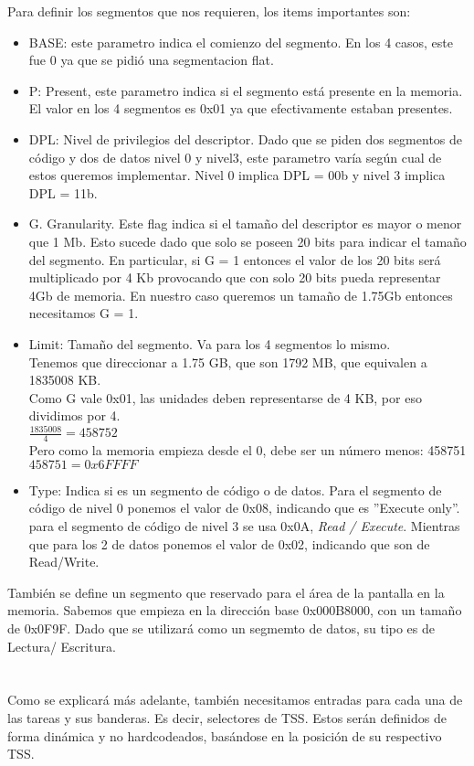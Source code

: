 Para definir los segmentos que nos requieren, los items importantes son:\\
\begin{itemize}
 \item BASE: este parametro indica el comienzo del segmento. En los 4 casos, este fue 0 ya que se pidió una segmentacion flat.
 \item P: Present, este parametro indica si el segmento est\'a presente en la memoria. El valor en los 4 segmentos es 0x01 ya que efectivamente estaban presentes.
 \item DPL: Nivel de privilegios del descriptor. Dado que se piden dos segmentos de código y dos de datos nivel 0 y nivel3, este 
parametro var\'ia seg\'un cual de estos queremos implementar. Nivel 0 implica DPL = 00b y nivel 3 implica DPL = 11b.
 \item G. Granularity. Este flag indica si el tamaño del descriptor es mayor o menor que 1 Mb. Esto sucede dado que solo se poseen 20 bits para 
indicar el tamaño del segmento. En particular, si G = 1 entonces el valor de los 20 bits ser\'a multiplicado por 4 Kb provocando que con 
 solo 20 bits pueda representar 4Gb de memoria. En nuestro caso queremos un tamaño de 1.75Gb entonces necesitamos G = 1.
 \item Limit: Tamaño del segmento. Va para los 4 segmentos lo mismo.\\
  \indent Tenemos que direccionar a 1.75 GB, que son 1792 MB, que equivalen a 1835008 KB.\\
  \indent Como G vale 0x01, las unidades deben representarse de 4 KB, por eso dividimos por 4.\\
  \indent $\frac{1835008}{4} = 458752$\\
  \indent Pero como la memoria empieza desde el 0, debe ser un n\'umero menos: 458751\\
  \indent $458751 = 0x6FFFF$
 \item Type: Indica si es un segmento de c\'odigo o de datos. Para el segmento de c\'odigo de nivel 0 ponemos el valor de 0x08, indicando 
que es ''Execute only''. para el segmento de c\'odigo de nivel 3 se usa 0x0A, \emph{Read / Execute}. Mientras que para los 2 de datos 
ponemos el valor de 0x02, indicando que son de Read/Write.
\end{itemize}

Tambi\'en se define un segmento que reservado para el \'area de la pantalla en la memoria. Sabemos que empieza en la direcci\'on base
0x000B8000, con un tamaño de 0x0F9F. Dado que se utilizar\'a como un segmemto de datos, su tipo es de Lectura/ Escritura.\\\\
\\
Como se explicar\'a m\'as adelante, tambi\'en necesitamos entradas para cada una de las tareas y sus banderas. Es decir, selectores de TSS. Estos ser\'an definidos de forma din\'amica y no hardcodeados, bas\'andose en la posici\'on de su respectivo TSS.

